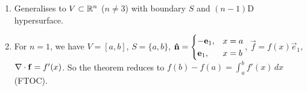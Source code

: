 \documentclass[10pt, a4paper]{article}
\begin{document}
\begin{remark}\phantom{}
    \begin{enumerate}[label = (\arabic*)]
        \item Generalises to $V \subset \mathbb{R} ^ n$
        ($n \neq 3$)
        with boundary $S$ and $(n - 1)$D hypersurface.

        \item For $n = 1$,
        we have $V = [a, b]$,
        $S = \{a, b\}$,
        $\mathbf{\hat{n}} = \begin{cases}
            -\mathbf{e}_1, &x = a \\
            \mathbf{e}_1, &x = b
        \end{cases}$,
        $\vec{f} = f(x)\vec{e}_1$,
        $\mathbf{\nabla} \cdot \mathbf{f} = f'(x)$.
        So the theorem reduces to $f(b) - f(a) = \int_{a}^{b}f'(x)\,dx$
        (FTOC).
    \end{enumerate}
\end{remark}
\end{document}

